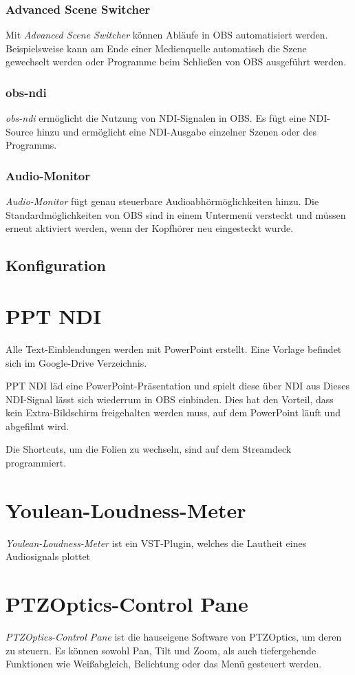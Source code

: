 			\subsubsection{Advanced Scene Switcher}
				Mit \textit{Advanced Scene Switcher} können Abläufe in \Gls{OBS} automatisiert werden.
				Beispielsweise kann am Ende einer Medienquelle automatisch die Szene gewechselt werden oder Programme beim Schließen von \Gls{OBS} ausgeführt werden.
			\subsubsection{obs-ndi}\label{ndi}
				\textit{obs-ndi} ermöglicht die Nutzung von \Gls{NDI}-Signalen in \Gls{OBS}.
				Es fügt eine \Gls{NDI}-Source hinzu und ermöglicht eine \Gls{NDI}-Ausgabe einzelner Szenen oder des Programms.
			\subsubsection{Audio-Monitor}
				\textit{Audio-Monitor} fügt genau steuerbare Audioabhörmöglichkeiten hinzu.
				Die Standardmöglichkeiten von OBS sind in einem Untermenü versteckt und müssen erneut aktiviert werden, wenn der Kopfhörer neu eingesteckt wurde.

		\subsection{Konfiguration}
			
	\section{PPT NDI}
		Alle Text-Einblendungen werden mit PowerPoint erstellt.
		Eine Vorlage befindet sich im Google-Drive Verzeichnis.

		PPT NDI läd eine PowerPoint-Präsentation und spielt diese über \Gls{NDI} aus
		Dieses \Gls{NDI}-Signal lässt sich wiederrum in \Gls{OBS} einbinden.
		Dies hat den Vorteil, dass kein Extra-Bildschirm freigehalten werden muss, auf dem PowerPoint läuft und abgefilmt wird.

		Die Shortcuts, um die Folien zu wechseln, sind auf dem Streamdeck programmiert.
	\section{Youlean-Loudness-Meter}
		\textit{Youlean-Loudness-Meter} ist ein \Gls{VST-Plugin}, welches die \Gls{Lautheit} eines Audiosignals plottet
	\section{PTZOptics-Control Pane}
		\textit{PTZOptics-Control Pane} ist die hauseigene Software von PTZOptics, um deren  zu steuern.
		Es können sowohl Pan, Tilt und Zoom, als auch tiefergehende Funktionen wie Weißabgleich, Belichtung oder das Menü gesteuert werden.